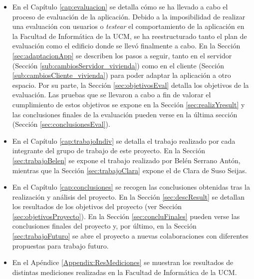 \begin{itemize}
	\item En el Capítulo \ref{cap:evaluacion} se detalla cómo se ha llevado a cabo el proceso de evaluación de la aplicación. Debido a la imposibilidad de realizar una evaluación con usuarios o \textit{testear} el comportamiento de la aplicación en la Facultad de Informática de la UCM, se ha reestructurado tanto el plan de evaluación como el edificio donde se llevó finalmente a cabo. En la Sección \ref{sec:adaptacionApp} se describen los pasos a seguir, tanto en el servidor (Sección \ref{sub:cambiosServidor_vivienda}) como en el cliente (Sección \ref{sub:cambiosCliente_vivienda}) para poder adaptar la aplicación a otro espacio. Por su parte, la Sección \ref{sec:objetivosEval} detalla los objetivos de la evaluación. Las pruebas que se llevaron a cabo a fin de valorar el cumplimiento de estos objetivos se expone en la Sección \ref{sec:realizYresult} y las conclusiones finales de la evaluación pueden verse en la última sección (Sección \ref{sec:conclusionesEval}).

	\item En el Capítulo \ref{cap:trabajoIndiv} se detalla el trabajo realizado por cada integrante del grupo de trabajo de este proyecto. En la Sección \ref{sec:trabajoBelen} se expone el trabajo realizado por Belén Serrano Antón, mientras que la Sección \ref{sec:trabajoClara} expone el de Clara de Suso Seijas.

	\item En el Capítulo \ref{cap:conclusiones} se recogen las conclusiones obtenidas tras la realización y análisis del proyecto. En la Sección \ref{sec:descResult} se detallan los resultados de los objetivos del proyecto (ver Sección \ref{sec:objetivosProyecto}). En la Sección \ref{sec:concluFinales} pueden verse las conclusiones finales del proyecto y, por último, en la Sección \ref{sec:trabajoFuturo} se abre el proyecto a nuevas colaboraciones con diferentes propuestas para trabajo futuro.

	\item En el Apéndice \ref{Appendix:ResMediciones} se muestran los resultados de distintas mediciones realizadas en la Facultad de Informática de la UCM.

\end{itemize}